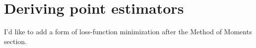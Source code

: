 

\part*{Deriving point estimators}%

I'd like to add a form of loss-function minimization after the Method
of Moments section.


